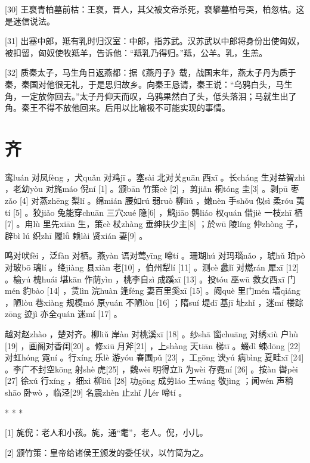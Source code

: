 \documentclass[12pt,UTF8]{ctexbook}
\begin{document}
[30] 王裒青柏墓前枯：王裒，晋人，其父被文帝杀死，裒攀墓柏号哭，柏忽枯。这是迷信说法。

[31] 出塞中郎，羝有乳时归汉室：中郎，指苏武。汉苏武以中郎将身份出使匈奴，被扣留，匈奴使牧羝羊，告诉他：“羝乳乃得归。”羝，公羊。乳，生羔。

[32] 质秦太子，马生角日返燕都：据《燕丹子》载，战国末年，燕太子丹为质于秦，秦国对他很无礼，于是思归故乡。向秦王恳请，秦王说：“乌鸦白头，马生角，一定放你回去。”太子丹仰天而叹，乌鸦果然白了头，低头落泪；马就生出了角。秦王不得不放他回来。后用以比喻极不可能实现的事情。





\chapter{齐}


鸾luán 对凤fèng ，犬quǎn 对鸡jī 。塞sài 北对关guān 西xī 。长cháng 生对益智zhì ，老幼yòu 对旄máo 倪ní [1] 。颁bān 竹策cè [2] ，剪jiǎn 桐tóng 圭[3] 。剥pū 枣zǎo [4] 对蒸zhēng 梨lí 。绵mián 腰如rú 弱ruò 柳liǔ ，嫩nèn 手shǒu 似sì 柔róu 荑tí [5] 。狡jiǎo 兔能穿chuān 三穴xué 隐[6] ，鹪jiāo 鹩liáo 权quán 借jiè 一枝zhī 栖[7] 。甪lù 里先xiān 生，策cè 杖zhàng 垂绅扶少主[8] ；於wū 陵líng 仲zhòng 子，辟bì lú 织zhī 履lǚ 赖lài 贤xián 妻[9] 。

鸣对吠fèi ，泛fàn 对栖。燕yàn 语对莺yīng 啼tí 。珊瑚hú 对玛瑙nǎo ，琥hǔ 珀pò 对玻bō 璃lí 。绛jiàng 县xiàn 老[10] ，伯州犁lí [11] 。测cè 蠡lǐ 对燃rán 犀xī [12] 。榆yú 槐huái 堪kān 作荫yìn ，桃李自zì 成蹊xī [13] 。投tóu 巫wū 救女西xī 门mén 豹bào [14] ，赁lìn 浣huàn 逢féng 妻百里奚xī [15] 。阙què 里门mén 墙qiáng ，陋lòu 巷xiàng 规模mó 原yuán 不陋lòu [16] ；隋suí 堤dī 基jī 址zhǐ ，迷mí 楼踪zōng 迹jì 亦全quán 迷mí [17] 。

越对赵zhào ，楚对齐。柳liǔ 岸àn 对桃溪xī [18] 。纱shā 窗chuāng 对绣xiù 户hù [19] ，画阁对香闺[20] 。修xiū 月斧[21] ，上shàng 天tiān 梯tī 。蝃dì 蝀dōng [22] 对虹hóng 霓ní 。行xíng 乐lè 游yóu 春圃pǔ [23] ，工gōng 谀yú 病bìng 夏畦xī [24] 。李广不封空kōng 射shè 虎[25] ，魏wèi 明得立lì 为wèi 存麑ní [26] 。按àn 辔pèi [27] 徐xú 行xíng ，细xì 柳liǔ [28] 功gōng 成劳láo 王wáng 敬jìng ；闻wén 声稍shāo 卧wò ，临泾[29] 名震zhèn 止zhǐ 儿ér 啼tí 。



* * *



[1] 旄倪：老人和小孩。旄，通“耄”，老人。倪，小儿。

[2] 颁竹策：皇帝给诸侯王颁发的委任状，以竹简为之。
\end{document}
